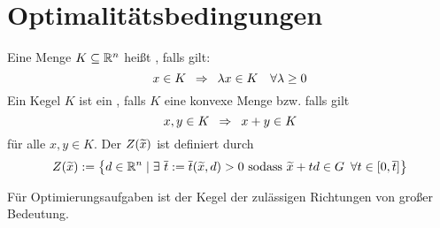 \section{Optimalitätsbedingungen}

\begin{definition} %
	\label{definition: 2.3_kegel}
	Eine Menge $K \subseteq \mathbb{R}^n$ heißt , falls gilt:
	\begin{equation*}
		x \in K \enskip \Rightarrow \enskip \lambda x \in K \quad \forall \lambda \ge 0
	\end{equation*}
	Ein Kegel $K$ ist ein , falls $K$ eine konvexe Menge bzw. falls gilt
	\begin{equation*}
		x,y \in K \enskip \Rightarrow \enskip x+y \in K
	\end{equation*}
	für alle $x,y \in K$. Der  $Z(\widetilde{x})$ ist definiert durch
	\begin{equation*}
		Z(\widetilde{x}) \mathrel{:=} \left\{ d \in \mathbb{R}^n \mid \exists \ \overline{t} \mathrel{:=} \overline{t}(\widetilde{x},d) > 0 \text{ sodass } \widetilde{x} + td \in G \enskip \forall t \in [0,\overline{t}] \right\}
	\end{equation*}
\end{definition}



Für Optimierungsaufgaben ist der Kegel der zulässigen Richtungen von großer Bedeutung.

